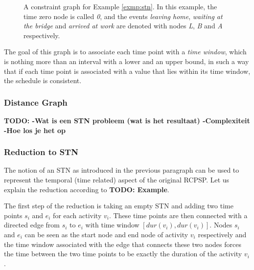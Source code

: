 \documentclass{article}
\theoremstyle{definition}
\newcommand{\TODO}[1]{{\color{red}\textbf{TODO: #1}}}
\newcommand{\dur}[1]{\ensuremath{dur(v_{#1})}} %
\begin{document}
\begin{figure}[h]
	\centering
	\caption{A constraint graph for Example \ref{exmp:stn}. In this example, the time zero node is called \emph{0}, and the events \emph{leaving home},  \emph{waiting at the bridge} and \emph{arrived at work} are denoted with nodes \emph{L}, \emph{B} and \emph{A} respectively.}
\end{figure}

The goal of this graph is to associate each time point with a \emph{time window}, which is nothing more than an interval with a lower and an upper bound, in such a way that if each time point is associated with a value that lies within its time window, the schedule is consistent.

\subsubsection{Distance Graph}
\TODO{
		-Wat is een STN probleem (wat is het resultaat)
		-Complexiteit
		-Hoe los je het op
}

\subsubsection{Reduction to STN}
The notion of an STN as introduced in the previous paragraph can be used to represent the temporal (time related) aspect of the original RCPSP. Let us explain the reduction according to \TODO{Example}.

The first step of the reduction is taking an empty STN and adding two time points $s_i$ and $e_i$ for each activity $v_i$. 
These time points are then connected with a directed edge from $s_i$ to $e_i$ with time window $[\dur{i}, \dur{i}]$. 
Nodes $s_i$ and $e_i$ can be seen as the start node and end node of activity $v_i$ respectively and the time window associated with the edge that connects these two nodes forces the time between the two time points to be exactly the duration of the activity $v_i$.
\end{document}
